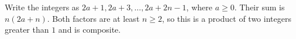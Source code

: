 Write the integers as $2a+1,2a+3,\ldots,2a+2n-1$, where $a\ge0$. Their sum is $n(2a+n)$. Both factors are at least $n\ge2$, so this is a product of two integers greater than $1$ and is composite.
